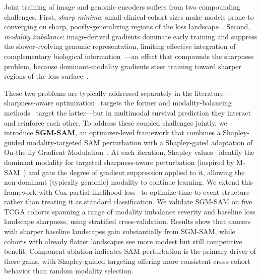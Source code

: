 \documentclass[10pt]{article}\usepackage[utf8]{inputenc}\usepackage[T1]{fontenc}\usepackage{amsmath,amssymb,amsfonts,bm}\usepackage{booktabs}\usepackage{multirow}\usepackage{array}\usepackage{graphicx}\usepackage{algorithm}\usepackage{algorithmic}\usepackage{xcolor}\usepackage[margin=1in]{geometry}\usepackage{microtype}
\begin{document}
Joint training of image and genomic encoders suffers from two compounding challenges. First, \emph{sharp minima}: small clinical cohort sizes make models prone to converging on sharp, poorly-generalizing regions of the loss landscape~\cite{keskar2017largebatch,hochreiter1997flat}. Second, \emph{modality imbalance}: image-derived gradients dominate early training and suppress the slower-evolving genomic representation, limiting effective integration of complementary biological information~\cite{wang2020hard,peng2022balanced}---an effect that compounds the sharpness problem, because dominant-modality gradients steer training toward sharper regions of the loss surface~\cite{foret2021sam,kwon2021asam,zhuang2022gsam,liu2022looksam}.

These two problems are typically addressed separately in the literature---sharpness-aware optimization~\cite{foret2021sam} targets the former and modality-balancing methods~\cite{peng2022balanced,du2023unimodal,fan2023pmr} target the latter---but in multimodal survival prediction they interact and reinforce each other. To address these coupled challenges jointly, we introduce \textbf{SGM-SAM}, an optimizer-level framework that combines a Shapley-guided modality-targeted SAM perturbation with a Shapley-gated adaptation of On-the-fly Gradient Modulation~\cite{peng2022balanced}. At each iteration, Shapley values~\cite{shapley1953} identify the dominant modality for targeted sharpness-aware perturbation (inspired by M-SAM~\cite{rajoli2025msam}) and gate the degree of gradient suppression applied to it, allowing the non-dominant (typically genomic) modality to continue learning. We extend this framework with Cox partial likelihood loss~\cite{cox1972,katzman2018deepsurv} to optimize time-to-event structure rather than treating it as standard classification. We validate SGM-SAM on five TCGA cohorts spanning a range of modality imbalance severity and baseline loss landscape sharpness, using stratified cross-validation. Results show that cancers with sharper baseline landscapes gain substantially from SGM-SAM, while cohorts with already flatter landscapes see more modest but still competitive benefit. Component ablation indicates SAM perturbation is the primary driver of these gains, with Shapley-guided targeting offering more consistent cross-cohort behavior than random modality selection.
\end{document}
